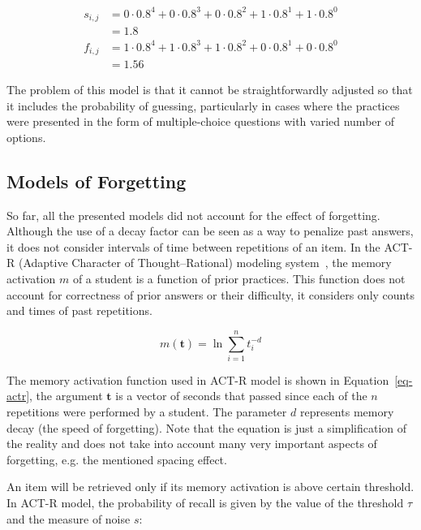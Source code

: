 \begin{equation} \label{eq-pfa-gong-example}
  \begin{split}
  s_{i,j} & = 0 \cdot 0.8^4 + 0 \cdot 0.8^3 + 0 \cdot 0.8^2 + 1 \cdot 0.8^1 + 1 \cdot 0.8^0 \\
  & = 1.8 \\
  f_{i,j} & = 1 \cdot 0.8^4 + 1 \cdot 0.8^3 + 1 \cdot 0.8^2 + 0 \cdot 0.8^1 + 0 \cdot 0.8^0 \\
  & = 1.56
  \end{split}
\end{equation}

The problem of this model is that it cannot be straightforwardly adjusted so that it includes the probability of guessing, particularly in cases where the practices were presented in the form of multiple-choice questions with varied number of options.

\subsection{Models of Forgetting}
\label{spacing-effect}

So far, all the presented models did not account for the effect of forgetting. Although the use of a decay factor can be seen as a way to penalize past answers, it does not consider intervals of time between repetitions of an item. In the ACT-R (Adaptive Character of Thought--Rational) modeling system~\cite{Pavlik2003}, the memory activation $m$ of a student is a function of prior practices. This function does not account for correctness of prior answers or their difficulty, it considers only counts and times of past repetitions.

\begin{equation} \label{eq-actr}
  m(\mathbf{t}) = \ln{\sum_{i=1}^{n} t_{i}^{-d}}
\end{equation}

The memory activation function used in ACT-R model is shown in Equation~\ref{eq-actr}, the argument $\mathbf{t}$ is a vector of seconds that passed since each of the $n$ repetitions were performed by a student. The parameter $d$ represents memory decay (the speed of forgetting). Note that the equation is just a simplification of the reality and does not take into account many very important aspects of forgetting, e.g. the mentioned spacing effect.

An item will be retrieved only if its memory activation is above certain threshold. In ACT-R model, the probability of recall is given by the value of the threshold $\tau$ and the measure of noise $s$: 

